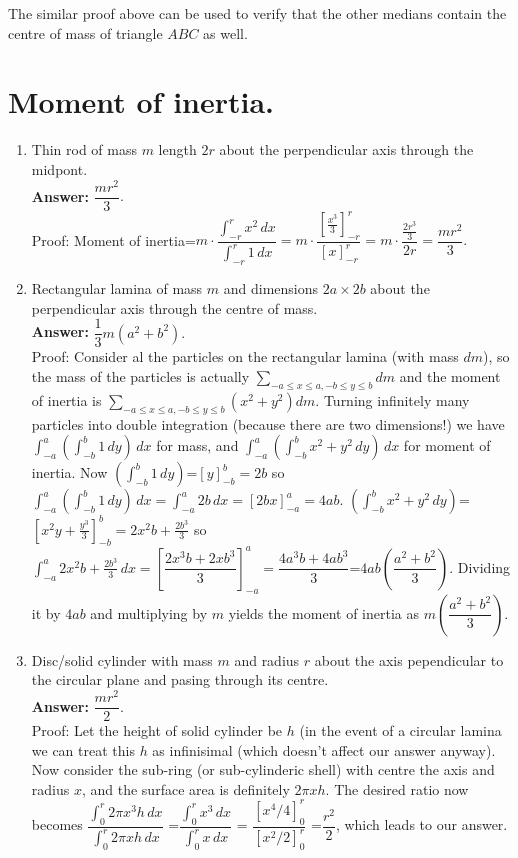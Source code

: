 \documentclass[11pt,a4paper]{article}
\begin{document}
\begin{enumerate}
The similar proof above can be used to verify that the other medians contain the centre of mass of triangle $ABC$ as well.

\end{enumerate}

\section {Moment of inertia.}
\begin{enumerate}
\item Thin rod of mass $m$ length $2r$ about the perpendicular axis through the midpont.\\
\textbf {Answer: }$\dfrac{mr^2}{3}.$\\
Proof: Moment of inertia=$m\cdot\dfrac{\int_{-r}^{r} x^2\, dx}{\int_{-r}^{r} 1\, dx}=m\cdot\dfrac{[\frac{x^{3}}{3}]_{-r}^{r}}{[x]_{-r}^{r}}=m\cdot\dfrac{\frac{2r^{3}}{3}}{2r}=\dfrac{mr^2}{3}.$

\item Rectangular lamina of mass $m$ and dimensions $2a\times 2b$ about the perpendicular axis through the centre of mass.\\
\textbf {Answer: }$\dfrac{1}{3}m(a^2+b^2).$\\
Proof: Consider al the particles on the rectangular lamina (with mass $dm$), so the mass of the particles is actually $\displaystyle\sum_{-a\le x \le a, -b\le y\le b} dm$ and the moment of inertia is $\displaystyle\sum_{-a\le x \le a, -b\le y\le b} (x^2+y^2) dm$. Turning infinitely many particles into double integration (because there are two dimensions!) we have $\int_{-a}^{a}(\int_{-b}^{b} 1\,dy)\,dx$ for mass, and $\int_{-a}^{a}(\int_{-b}^{b} x^2+y^2\,dy)\,dx$ for moment of inertia. Now $(\int_{-b}^{b} 1\,dy)$=$[y]_{-b}^{b}=2b$ so $\int_{-a}^{a}(\int_{-b}^{b} 1\,dy)\,dx=\int_{-a}^{a}2b\,dx=[2bx]_{-a}^{a}=4ab.$ $(\int_{-b}^{b} x^2+y^2\,dy)$=$[x^2y+\frac{y^3}{3}]_{-b}^{b}=2x^2b+\frac{2b^3}{3}$ so $\int_{-a}^{a} 2x^2b+\frac{2b^3}{3}\,dx=[\dfrac{2x^3b+2xb^3}{3}]_{-a}^{a}=\dfrac{4a^3b+4ab^3}{3}$=$4ab\left(\dfrac{a^2+b^2}{3}\right).$ Dividing it by $4ab$ and multiplying by $m$ yields the moment of inertia as $m\left(\dfrac{a^2+b^2}{3}\right)$.

\item Disc/solid cylinder with mass $m$ and radius $r$ about the axis pependicular to the circular plane and pasing through its centre.\\
\textbf {Answer: } $\dfrac{mr^2}{2}$.\\
Proof: Let the height of solid cylinder be $h$ (in the event of a circular lamina we can treat this $h$ as infinisimal (which doesn't affect our answer anyway). Now consider the sub-ring (or sub-cylinderic shell) with centre the axis and radius $x$, and the surface area is definitely $2\pi xh$. The desired ratio now becomes $\dfrac{\int_0^r 2\pi x^3h\,dx}{\int_0^r 2\pi xh\,dx}$ =$\dfrac{\int_0^r x^3\,dx}{\int_0^r x\,dx}$ = $\dfrac{[x^4/4]_0^r}{[x^2/2]_0^r}$ =$\dfrac{r^2}{2}$, which leads to our answer.


\end{enumerate}
\end{document}
